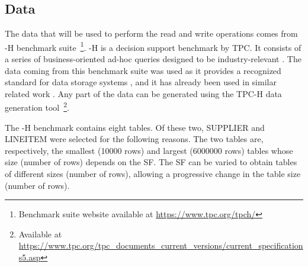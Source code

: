 \subsection{Data}
\label{subsec:data}

The data that will be used to perform the read and write operations comes from -H benchmark suite~\footnote{Benchmark suite website available at \url{https://www.tpc.org/tpch/}}. -H is a decision support benchmark by \gls{TPC}. It consists of a series of business-oriented ad-hoc queries designed to be industry-relevant \cite{transactionprocessingperformancecounciltpcTPCH_v301pdf1993}. The data coming from this benchmark suite was used as
it provides a recognized standard for data storage systems \cite{TPC_benchmarks_2000}, and it has already been used in similar related work \cite{raasveldtDuckDBEmbeddableAnalytical2019, behmPhotonFastQuery2022}. Any part of the data can be generated using the TPC-H data generation tool~\footnote{Available at \url{https://www.tpc.org/tpc_documents_current_versions/current_specifications5.asp}}.

The -H benchmark contains eight tables. Of these two, SUPPLIER and LINEITEM were selected for the following reasons. The two tables are, respectively, the smallest (10000 rows) and largest (6000000 rows) tables whose size (number of rows) depends on the \gls{SF}. The \gls{SF} can be varied to obtain tables of different sizes (number of rows), allowing a progressive change in the table size (number of rows). 


